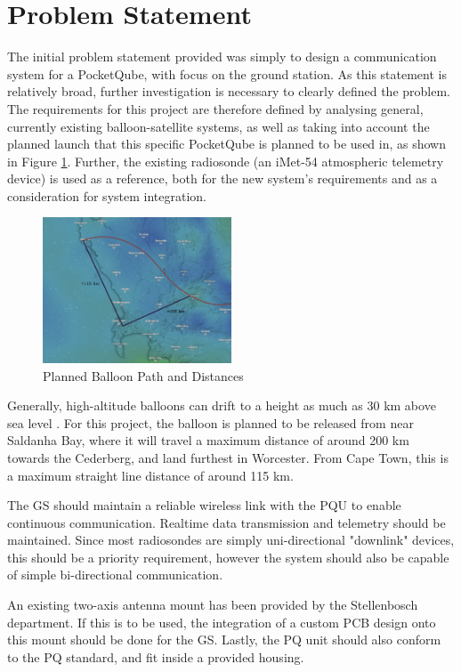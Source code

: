 \graphicspath{{./figures/}}

\section{Problem Statement}

The initial problem statement provided was simply to design a communication system for a PocketQube, with focus on the ground station. As this statement is relatively broad, further investigation is necessary to clearly defined the problem. The requirements for this project are therefore defined by analysing general, currently existing balloon-satellite systems, as well as taking into account the planned launch that this specific PocketQube is planned to be used in, as shown in Figure \ref{fig:balloon_path}. Further, the existing radiosonde (an iMet-54 atmospheric telemetry device) is used as a reference, both for the new system's requirements and as a consideration for system integration.

\begin{figure}[!htb]
  \centering
  \includegraphics[width=0.5\textwidth]{balloon_path}
  \caption{Planned Balloon Path and Distances}
  \label{fig:balloon_path}
\end{figure}

Generally, high-altitude balloons can drift to a height as much as 30 km above sea level \cite{site-weatherWeatherBalloons}. For this project, the balloon is planned to be released from near Saldanha Bay, where it will travel a maximum distance of around 200 km towards the Cederberg, and land furthest in Worcester. From Cape Town, this is a maximum straight line distance of around 115 km. 

The GS should maintain a reliable wireless link with the PQU to enable continuous communication. Realtime data transmission and telemetry should be maintained. Since most radiosondes are simply uni-directional "downlink" devices, this should be a priority requirement, however the system should also be capable of simple bi-directional communication.

An existing two-axis antenna mount has been provided by the Stellenbosch department. If this is to be used, the integration of a custom PCB design onto this mount should be done for the GS. Lastly, the PQ unit should also conform to the PQ standard, and fit inside a provided housing.